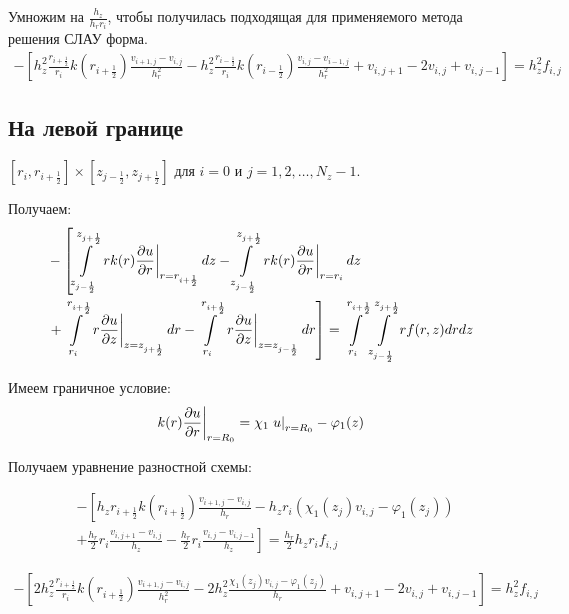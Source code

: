 Умножим на $\frac{h_z}{h_r r_i}$, чтобы получилась подходящая для применяемого метода решения СЛАУ форма.
\begin{align*}
  - \left [ 
  h_z^2 \frac{r_{i+\frac{1}{2}}}{r_i} k(r_{i+\frac{1}{2}}) \frac{v_{i+1, j} - v_{i, j}}{h_{r}^2}
  - h_z^2 \frac{r_{i-\frac{1}{2}}}{r_i} k(r_{i-\frac{1}{2}}) \frac{v_{i, j} - v_{i - 1, j}}{h_{r}^2}
  + v_{i, j + 1} - 2 v_{i, j} + v_{i, j - 1}
  \right ]  = h_z^2 f_{i, j}
\end{align*}

\subsection{На левой границе}

$ [r_{i}, r_{i +\frac{1}{2}}] \times  [z_{j -\frac{1}{2}}, z_{j +\frac{1}{2}}] $
для $ i = 0 $ и $ j = 1, 2, \dots, N_z - 1$.

Получаем:
\begin{align*}
  &- \left [
   \mLimZ{z}{+\frac{1}{2}}{-\frac{1}{2}}{j}  \left . r k(r) \pdv{u}{r} \right \vert_{r = r_{i + \frac{1}{2}}} dz
  - \mLimZ{z}{+\frac{1}{2}}{-\frac{1}{2}}{j} \left . r k(r) \pdv{u}{r} \right \vert_{r = r_{i}} dz
  \right . \\
  &\left . + \mLimS{r}{+\frac{1}{2}}{} \left . r\pdv{u}{z} \right \vert_{z = z_{j + \frac{1}{2}}} dr
  - \mLimS{r}{+\frac{1}{2}}{} \left . r\pdv{u}{z} \right \vert_{z = z_{j - \frac{1}{2}}} dr
  \right ] = \mLim{+\frac{1}{2}}{}{+\frac{1}{2}}{-\frac{1}{2}} rf(r, z) dr dz
\end{align*}

Имеем граничное условие:
\[ \left . k(r) \pdv{u}{r} \right \vert_{r=R_0} = \chi_1 \left . u \right \vert_{r=R_0} - \varphi_1(z) \]

Получаем уравнение разностной схемы:

\begin{align*}
  &- \left [ 
  h_z r_{i+\frac{1}{2}} k(r_{i+\frac{1}{2}}) \frac{v_{i+1, j} - v_{i, j}}{h_{r}}
  - h_z r_{i} (\chi_1(z_j) v_{i, j} - \varphi_1(z_j))
  \right . \\
  &\left .
  + \frac{h_r}{2} r_{i} \frac{v_{i, j + 1} - v_{i, j}}{h_{z}}
  - \frac{h_r}{2} r_{i} \frac{v_{i, j} - v_{i, j - 1}}{h_z}
  \right ]  = \frac{h_r}{2} h_z r_i f_{i, j}
\end{align*}

\begin{align*}
  - \left [ 
  2 h_z^2 \frac{r_{i+\frac{1}{2}}}{r_i} k(r_{i+\frac{1}{2}}) \frac{v_{i+1, j} - v_{i, j}}{h_{r}^2}
  - 2 h_z^2 \frac{\chi_1(z_j) v_{i, j} - \varphi_1(z_j)}{h_r}
  + v_{i, j + 1} - 2 v_{i, j} + v_{i, j - 1}
  \right ]  = h_z^2 f_{i, j}
\end{align*}

